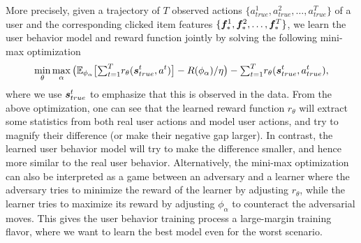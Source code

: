 \documentclass{article} %
\newcommand{\Le}[1]{{\color{red}{\bf\sf [ #1]}}}
\newcommand{\xc}[1]{{\color{blue}{\bf\sf #1}}}
\begin{document}
More precisely, given a trajectory of $T$ observed actions {\small $\{a^1_{true},a^2_{true},\ldots,a^T_{true}\}$} of a user and the corresponding clicked item features $\{{\bm{f}}_\ast^1, {\bm{f}}_\ast^2, \ldots, {\bm{f}}_\ast^T\}$, we learn the user behavior model and reward function jointly by solving the following mini-max optimization 
 \begin{equation}\label{eq:std-minmax}
	\min_{\theta } \max_{\alpha } \big( \mathbb{E}_{\phi_\alpha} \big[{\textstyle\sum_{t=1}^T}r_{\theta}({\bm{s}}^t_{true}, a^t)\big] -R(\phi_\alpha)/\eta\big)-{\textstyle\sum_{t=1}^T} r_{\theta}({\bm{s}}^t_{true}, a^t_{true}),
\end{equation}
where 
we use ${\bm{s}}^t_{true}$ to emphasize that this is observed in the data. From the above optimization, one can see that the learned reward function $r_\theta$ will extract some statistics from both real user actions and model user actions, and try to magnify their difference (or make their negative gap larger). In contrast, the learned user behavior model will try to make the difference smaller, and hence more similar to the real user behavior. Alternatively, the mini-max optimization can also be interpreted as a game between an adversary and a learner where the adversary tries to minimize the reward of the learner by adjusting $r_\theta$, while the learner tries to maximize its reward by adjusting $\phi_\alpha$ to counteract the adversarial moves. This gives the user behavior training process a large-margin training flavor, where we want to learn the best model even for the worst scenario. 

\end{document}
